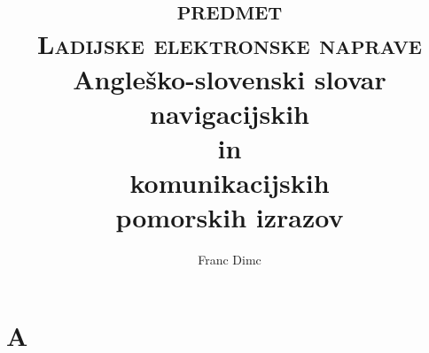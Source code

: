 \documentclass[10pt,a4paper,twoside]{article} %
\begin{document}
	\title{\textsc{predmet \\ Ladijske elektronske naprave}\\\vspace{1cm} {\Huge Angleško-slovenski slovar  navigacijskih \\ in \\ komunikacijskih \\ pomorskih izrazov}}
	\maketitle
	\begin{center}
		\author{Franc Dimc}
	\end{center}
	\newpage


\section*{A}
\end{document}
